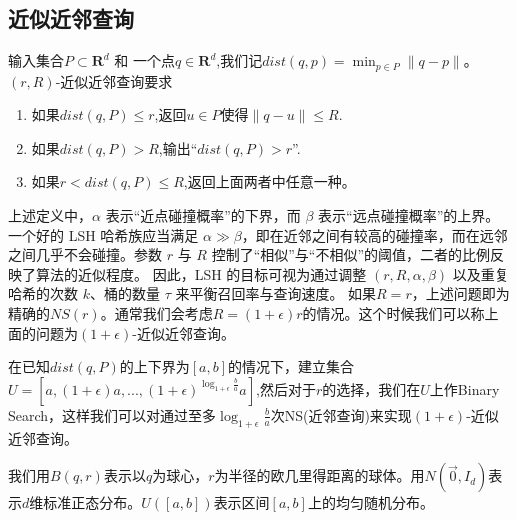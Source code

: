 \documentclass[lang=cn,newtx,10pt,scheme=chinese,chinesefont=nofont,citestyle=gb7714-2015, bibstyle=gb7714-2015]{elegantbook}
\begin{document}
\begin{refsection}
\subsection{近似近邻查询}
\begin{definition}[$(r,R)$-近似近邻查询]
    输入集合$P\subset \mathbf{R}^d$ 和 一个点$q\in \mathbf{R}^d$,我们记$dist(q,p)=\mathop{min}_{p\in P}\|q-p\|$。$(r,R)$-近似近邻查询要求
    \begin{enumerate}
        \item  如果$dist(q,P)\leq r$,返回$u\in P$使得$\|q-u\|\leq R$.
        \item 如果$dist(q,P)>R$,输出“$dist(q,P)>r$”.
        \item 如果$r<dist(q,P)\leq R$,返回上面两者中任意一种。
    \end{enumerate}
\end{definition}
上述定义中，$\alpha$ 表示“近点碰撞概率”的下界，而 $\beta$ 表示“远点碰撞概率”的上界。一个好的 LSH 哈希族应当满足 $\alpha \gg \beta$，即在近邻之间有较高的碰撞率，而在远邻之间几乎不会碰撞。参数 $r$ 与 $R$ 控制了“相似”与“不相似”的阈值，二者的比例反映了算法的近似程度。
因此，LSH 的目标可视为通过调整 $(r,R,\alpha,\beta)$ 以及重复哈希的次数 $k$、桶的数量 $\tau$ 来平衡召回率与查询速度。
如果$R=r$，上述问题即为精确的$NS(r)$。通常我们会考虑$R=(1+\epsilon)r$的情况。这个时候我们可以称上面的问题为$(1+\epsilon)$-近似近邻查询。

在已知$dist(q,P)$的上下界为$[a,b]$的情况下，建立集合$U=[a,(1+\epsilon)a,...,(1+\epsilon)^{\log_{1+\epsilon}\frac{b}{a}}a]$,然后对于$r$的选择，我们在$U$上作Binary Search，这样我们可以对通过至多$\log_{1+\epsilon}\frac{b}{a}$次NS(近邻查询)来实现$(1+\epsilon)$-近似近邻查询。

我们用$B(q,r)$表示以$q$为球心，$r$为半径的欧几里得距离的球体。用$N(\Vec{0},I_d)$表示$d$维标准正态分布。$U([a,b])$表示区间$[a,b]$上的均匀随机分布。


\end{refsection}
\end{document}
